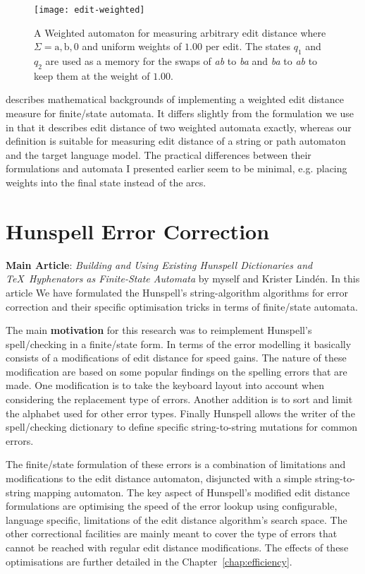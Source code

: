 \documentclass[officiallayout]{unihelcompling}
\begin{document}
\begin{figure}
    \texttt{[image: edit-weighted]}
    \caption{A Weighted automaton for measuring arbitrary edit distance where
        $\Sigma = {\mathrm{a}, \mathrm{b}, 0}$ and uniform weights of $1.00$ per
        edit. The states $q_1$ and $q_2$ are used as a memory for
        the swaps of \emph{ab} to \emph{ba} and \emph{ba} to \emph{ab} to
        keep them at the weight of $1.00$. \label{fig:edit-weighted}}
\end{figure}

\citet{mohri2003edit} describes mathematical backgrounds of implementing a
weighted edit distance measure for finite\-/state automata. It differs slightly
from the formulation we use in that it describes edit distance of two weighted
automata exactly, whereas our definition is suitable for measuring edit
distance of a string or path automaton and the target language model. The
practical differences between their formulations and automata I presented
earlier seem to be minimal, e.g. placing weights into the final state instead
of the arcs.

\section{Hunspell Error Correction}
\label{sec:Hunspell-error}

\textbf{Main Article}: \emph{Building and Using Existing Hunspell Dictionaries
and \TeX\ Hyphenators as Finite-State Automata} by myself and Krister Lindén.
In this article We have formulated the Hunspell's string-algorithm algorithms for
error correction and their specific optimisation tricks in terms of
finite\-/state automata.

The main \textbf{motivation} for this research was to reimplement Hunspell's
spell\-/checking in a finite\-/state form. In terms of the  error modelling it
basically consists of a modifications of edit distance for speed gains. The
nature of these modification are based on some popular findings on the spelling
errors that are made. One modification is to take the keyboard layout into
account when considering the replacement type of errors. Another addition is to
sort and limit the alphabet used for other error types. Finally Hunspell allows
the writer of the spell\-/checking dictionary to define specific
string-to-string mutations for common errors.

The finite\-/state formulation of these errors is a combination of limitations
and modifications to the edit distance automaton, disjuncted with a simple
string-to-string mapping automaton. The key aspect of Hunspell's modified
edit distance formulations are optimising the speed of the error lookup using
configurable, language specific, limitations of the edit distance algorithm's
search space. The other correctional facilities are mainly meant to cover the
type of errors that cannot be reached with regular edit distance modifications.
The effects of these optimisations are further detailed in the 
Chapter~\ref{chap:efficiency}.
\end{document}
